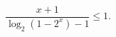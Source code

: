 \begin{ex}[type=inequality]
	\begin{condition}
		$ \dfrac{x + 1}{\log_2(1 - 2^x) - 1}\leqslant1 .$
	\end{condition}
\end{ex}